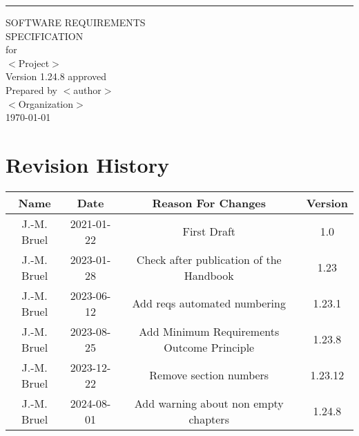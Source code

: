 \documentclass{scrreprt}
\date{}
\def\myversion{1.24.8 }
\theoremstyle{definition}
\begin{document}
\begin{flushright}
    \rule{16cm}{5pt}\vskip1cm
    \begin{bfseries}
        \Huge{SOFTWARE REQUIREMENTS\\ SPECIFICATION}\\
        \vspace{1.9cm}
        for\\
        \vspace{1.9cm}
        $<$Project$>$\\
        \vspace{1.9cm}
        \LARGE{Version \myversion approved}\\
        \vspace{1.9cm}
        Prepared by $<$author$>$\\
        \vspace{1.9cm}
        $<$Organization$>$\\
        \vspace{1.9cm}
        \today\\
    \end{bfseries}
\end{flushright}

\chapter*{Revision History}

\begin{center}
    \begin{tabular}{|c|c|c|c|}
        \hline
	    Name        & Date          & Reason For Changes & Version\\
        \hline
        \hline
	    J.-M. Bruel & 2021-01-22    & First Draft & 1.0\\
        \hline
	    J.-M. Bruel & 2023-01-28    & Check after publication of the Handbook & 1.23\\
        \hline
	    J.-M. Bruel & 2023-06-12    & Add reqs automated numbering & 1.23.1 \\
        \hline
	    J.-M. Bruel & 2023-08-25    & Add Minimum Requirements Outcome Principle & 1.23.8 \\
        \hline
	    J.-M. Bruel & 2023-12-22    & Remove section numbers & 1.23.12 \\
        \hline
	    J.-M. Bruel & 2024-08-01    & Add warning about non empty chapters  & \myversion \\
        \hline
    \end{tabular}
\end{center}
\end{document}
